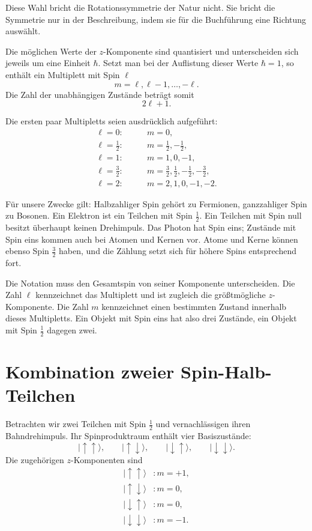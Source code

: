 Diese Wahl bricht die Rotationssymmetrie der Natur nicht. Sie bricht die Symmetrie nur in der Beschreibung, indem sie für die Buchführung eine Richtung auswählt.

Die möglichen Werte der \(z\)-Komponente sind quantisiert und unterscheiden sich jeweils um eine Einheit \(\hbar\). Setzt man bei der Auflistung dieser Werte \(\hbar=1\), so enthält ein Multiplett mit Spin \(\ell\)
\begin{equation}
m=\ell,\ell-1,\ldots,-\ell.
\end{equation}
Die Zahl der unabhängigen Zustände beträgt somit
\begin{equation}
2\ell+1.
\end{equation}

Die ersten paar Multipletts seien ausdrücklich aufgeführt:
\begin{align}
\ell=0:&\qquad m=0,\\
\ell=\frac12:&\qquad m=\frac12,-\frac12,\\
\ell=1:&\qquad m=1,0,-1,\\
\ell=\frac32:&\qquad
m=\frac32,\frac12,-\frac12,-\frac32,\\
\ell=2:&\qquad m=2,1,0,-1,-2.
\end{align}

Für unsere Zwecke gilt: Halbzahliger Spin gehört zu Fermionen, ganzzahliger Spin zu Bosonen. Ein Elektron ist ein Teilchen mit Spin \(\tfrac12\). Ein Teilchen mit Spin null besitzt überhaupt keinen Drehimpuls. Das Photon hat Spin eins; Zustände mit Spin eins kommen auch bei Atomen und Kernen vor. Atome und Kerne können ebenso Spin \(\tfrac32\) haben, und die Zählung setzt sich für höhere Spins entsprechend fort.

Die Notation muss den Gesamtspin von seiner Komponente unterscheiden. Die Zahl \(\ell\) kennzeichnet das Multiplett und ist zugleich die größtmögliche \(z\)-Komponente. Die Zahl \(m\) kennzeichnet einen bestimmten Zustand innerhalb dieses Multipletts. Ein Objekt mit Spin eins hat also drei Zustände, ein Objekt mit Spin \(\tfrac12\) dagegen zwei.

\section{Kombination zweier Spin-Halb-Teilchen}

Betrachten wir zwei Teilchen mit Spin \(\tfrac12\) und vernachlässigen ihren Bahndrehimpuls. Ihr Spinproduktraum enthält vier Basiszustände:
\begin{equation}
|\uparrow\uparrow\rangle,\qquad
|\uparrow\downarrow\rangle,\qquad
|\downarrow\uparrow\rangle,\qquad
|\downarrow\downarrow\rangle.
\end{equation}
Die zugehörigen \(z\)-Komponenten sind
\begin{align}
|\uparrow\uparrow\rangle &: m=+1,\\
|\uparrow\downarrow\rangle &: m=0,\\
|\downarrow\uparrow\rangle &: m=0,\\
|\downarrow\downarrow\rangle &: m=-1.
\end{align}


